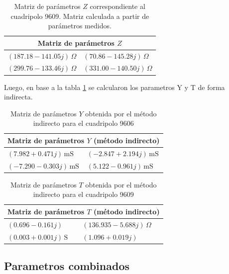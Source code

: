 \begin{table}[H]
\centering
\begin{tabular}{|l|l|}
\hline
\multicolumn{2}{|c|}{\textbf{Matriz de parámetros $Z$}} \\ \hline
$(187.18 - 141.05j)\,\Omega$ & $(70.86 - 145.28j)\,\Omega$ \\ \hline
$(299.76 - 133.46j)\,\Omega$ & $(331.00 - 140.50j)\,\Omega$ \\ \hline
\end{tabular}
\caption{Matriz de parámetros $Z$ correspondiente al cuadripolo 9609. Matriz calculada a partir de parámetros medidos.}
\label{tab:matriz_Z9609}
\end{table}

Luego, en base a la tabla \ref{tab:matriz_Z9609} se calcularon los parametros Y y T de forma indirecta.
	
	\begin{table}[H]
\centering
\begin{tabular}{|l|l|}
\hline
\multicolumn{2}{|c|}{\textbf{Matriz de parámetros $Y$ (método indirecto)}} \\ \hline
$(7.982 + 0.471j)\,\mathrm{mS}$ & $(-2.847 + 2.194j)\,\mathrm{mS}$ \\ \hline
$(-7.290 - 0.303j)\,\mathrm{mS}$ & $(5.122 - 0.961j)\,\mathrm{mS}$ \\ \hline
\end{tabular}
\caption{Matriz de parámetros $Y$ obtenida por el método indirecto para el cuadripolo 9606}
\label{tab:matriz_Y9606_indirecta}
\end{table}

\begin{table}[H]
\centering
\begin{tabular}{|l|l|}
\hline
\multicolumn{2}{|c|}{\textbf{Matriz de parámetros $T$ (método indirecto)}} \\ \hline
$(0.696 - 0.161j)$ & $(136.935 - 5.688j)\,\Omega$ \\ \hline
$(0.003 + 0.001j)\,\mathrm{S}$ & $(1.096 + 0.019j)$ \\ \hline
\end{tabular}
\caption{Matriz de parámetros $T$ obtenida por el método indirecto para el cuadripolo 9609}
\label{tab:matriz_T9609_indirecta}
\end{table}

	\subsection*{Parametros combinados}
	
